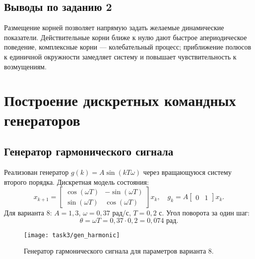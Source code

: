 \section*{Выводы по заданию 2}
Размещение корней позволяет напрямую задать желаемые динамические показатели. Действительные корни ближе к нулю дают быстрое апериодическое поведение, комплексные корни — колебательный процесс; приближение полюсов к единичной окружности замедляет систему и повышает чувствительность к возмущениям.

\chapter{Построение дискретных командных генераторов}
\section{Генератор гармонического сигнала}
Реализован генератор \(g(k) = A\sin(kT\omega)\) через вращающуюся систему второго порядка. Дискретная модель состояния:
\[
  x_{k+1} = \begin{bmatrix} \cos(\omega T) & -\sin(\omega T) \\ \sin(\omega T) & \cos(\omega T) \end{bmatrix} x_k, \quad g_k = A \begin{bmatrix} 0 & 1 \end{bmatrix} x_k.
\]
Для варианта 8: \(A = 1{,}3\), \(\omega = 0{,}37\) рад/с, \(T = 0{,}2\) с. Угол поворота за один шаг:
\[
  \theta = \omega T = 0{,}37 \cdot 0{,}2 = 0{,}074 \text{ рад}.
\]
\begin{figure}[H]
  \centering
  \texttt{[image: task3/gen\_harmonic]}
  \caption{Генератор гармонического сигнала для параметров варианта 8.}
\end{figure}

